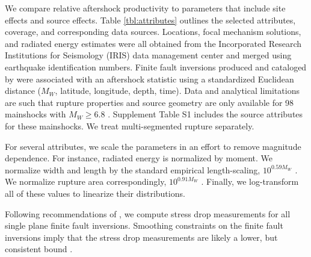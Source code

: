 \documentclass[draft, jgrga]{agujournal2018}
\begin{document}
We compare relative aftershock productivity to parameters that include site effects and source effects. Table \ref{tbl:attributes} outlines the selected attributes, coverage, and corresponding data sources. Locations, focal mechanism solutions, and radiated energy estimates were all obtained from the Incorporated Research Institutions for Seismology (IRIS) data management center and merged using earthquake identification numbers. Finite fault inversions produced and cataloged by \citet{Hayes2017} were associated with an aftershock statistic using a standardized Euclidean distance ($M_W$, latitude, longitude, depth, time).
Data and analytical limitations are such that rupture properties and source geometry are only available for 98 mainshocks with $M_W\ge6.8$ \citep{Hayes2017}. Supplement Table S1 includes the source attributes for these mainshocks. We treat multi-segmented rupture separately.

For several attributes, we scale the parameters in an effort to remove magnitude dependence. For instance, radiated energy is normalized by moment. We normalize width and length by the standard empirical length-scaling, $10^{0.59M_W}$ \citep[][Table 2A - Subsurface rupture dimensions]{Wells1994}. We normalize rupture area correspondingly, $10^{0.91M_W}$ \citep[][Table 2A - Rupture area]{Wells1994}. Finally, we log-transform all of these values to linearize their distributions.

Following recommendations of \citet{Noda2013}, we compute stress drop measurements for all single plane finite fault inversions. Smoothing constraints on the finite fault inversions imply that the stress drop measurements are likely a lower, but consistent bound \citep{Adams2017ExploringInversions}.
\end{document}
